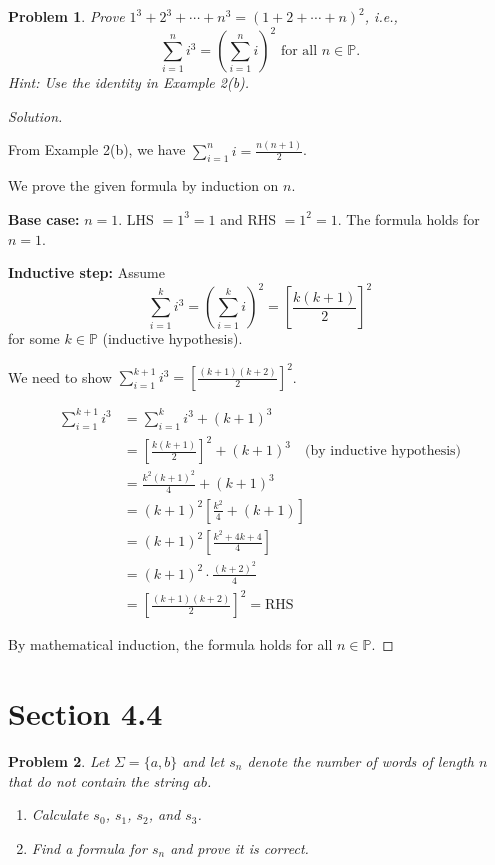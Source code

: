 \documentclass[12pt]{article}
\newtheorem{problem}{Problem}
\newcommand{\PP}{\ensuremath{\mathbb{P}}}
\begin{document}
\setcounter{problem}{19}
\begin{problem}
Prove $1^3 + 2^3 + \cdots + n^3 = (1 + 2 + \cdots + n)^2$, i.e.,
$$\sum_{i=1}^{n} i^3 = \left(\sum_{i=1}^{n} i\right)^2 \text{ for all } n \in \PP.$$
Hint: Use the identity in Example 2(b).
\end{problem}

\begin{proof}[Solution]
~

From Example 2(b), we have $\sum_{i=1}^{n} i = \frac{n(n+1)}{2}$.

We prove the given formula by induction on $n$.

\textbf{Base case:} $n = 1$. LHS $= 1^3 = 1$ and RHS $= 1^2 = 1$. The formula holds for $n = 1$.

\textbf{Inductive step:} Assume 
$$\sum_{i=1}^{k} i^3 = \left(\sum_{i=1}^{k} i\right)^2 = \left[\frac{k(k+1)}{2}\right]^2$$
for some $k \in \PP$ (inductive hypothesis).

We need to show $\sum_{i=1}^{k+1} i^3 = \left[\frac{(k+1)(k+2)}{2}\right]^2$.

\begin{align*}
\sum_{i=1}^{k+1} i^3 &= \sum_{i=1}^{k} i^3 + (k+1)^3 \\
&= \left[\frac{k(k+1)}{2}\right]^2 + (k+1)^3 \quad \text{(by inductive hypothesis)} \\
&= \frac{k^2(k+1)^2}{4} + (k+1)^3 \\
&= (k+1)^2 \left[\frac{k^2}{4} + (k+1)\right] \\
&= (k+1)^2 \left[\frac{k^2 + 4k + 4}{4}\right] \\
&= (k+1)^2 \cdot \frac{(k+2)^2}{4} \\
&= \left[\frac{(k+1)(k+2)}{2}\right]^2 = \text{RHS}
\end{align*}

By mathematical induction, the formula holds for all $n \in \PP$.
\end{proof}
\newpage
\section*{Section 4.4}

\setcounter{problem}{7}
\begin{problem}
Let $\Sigma = \{a, b\}$ and let $s_n$ denote the number of words of length $n$ that do not contain the string $ab$.

\begin{enumerate}[label=(\alph*)]
    \item Calculate $s_0$, $s_1$, $s_2$, and $s_3$.
    
    \item Find a formula for $s_n$ and prove it is correct.
\end{enumerate}
\end{problem}
\end{document}
